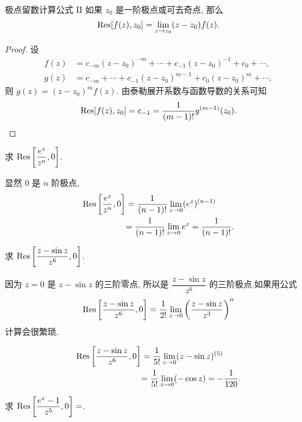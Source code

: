 \begin{second}{极点留数计算公式 II}
	如果 $z_0$ 是一阶极点或可去奇点, 那么
	\[{\mathrm{Res}}[f(z),z_0]=\lim\limits_{z\to z_0}(z-z_0)f(z).\]
\end{second}

\begin{proof}
	设
	\begin{align*}
		f(z)&=c_{-m}(z-z_0)^{-m}+\cdots+c_{-1}(z-z_0)^{-1}+c_0+\cdots,\\
		g(z)&=c_{-m}+\cdots+c_{-1}(z-z_0)^{m-1}+c_0(z-z_0)^m+\cdots,
	\end{align*}
{%
	则 $g(z)=(z-z_0)^mf(z)$.
}%
{%
	由泰勒展开系数与函数导数的关系可知
	\[{\mathrm{Res}}[f(z),z_0]=c_{-1}=\dfrac1{(m-1)!}g^{(m-1)}(z_0).\qedhere\]
}
\end{proof}

\begin{example}
	求 ${\mathrm{Res}}\left[\dfrac{e^z}{z^n},0\right]$.
\end{example}

\begin{solution}
		显然 $0$ 是 $n$ 阶极点,
	{\begin{align*}
			{\mathrm{Res}}\left[\frac{e^z}{z^n},0\right]&=\frac1{(n-1)!}\lim_{z\to0}(e^z)^{(n-1)}\\
			&{=\frac1{(n-1)!}\lim_{z\to0}e^z=\frac1{(n-1)!}.}
		\end{align*}
	}
\end{solution}

\begin{example}
	求 ${\mathrm{Res}}\left[\dfrac{z-\sin z}{z^6},0\right]$.
\end{example}

\begin{solution}
		因为 $z=0$ 是 $z-\sin z$ 的三阶零点,
	{所以是 $\dfrac{z-\sin z}{z^6}$ 的三阶极点.如果用公式
		\[{\mathrm{Res}}\left[\frac{z-\sin z}{z^6},0\right]
		=\frac1{2!}\lim_{z\to0}\left(\frac{z-\sin z}{z^3}\right)''\]
		计算会很繁琐.
	}

	{
	\begin{align*}
		{\mathrm{Res}}\left[\frac{z-\sin z}{z^6},0\right]&=\frac1{5!}\lim_{z\to0}(z-\sin z)^{(5)}\\
		&{=\frac1{5!}\lim_{z\to0}(-\cos z)=-\frac1{120}.}
	\end{align*}}
\end{solution}

\begin{exercise}
		求 ${\mathrm{Res}}\left[\dfrac{e^z-1}{z^5},0\right]=$.
\end{exercise}

